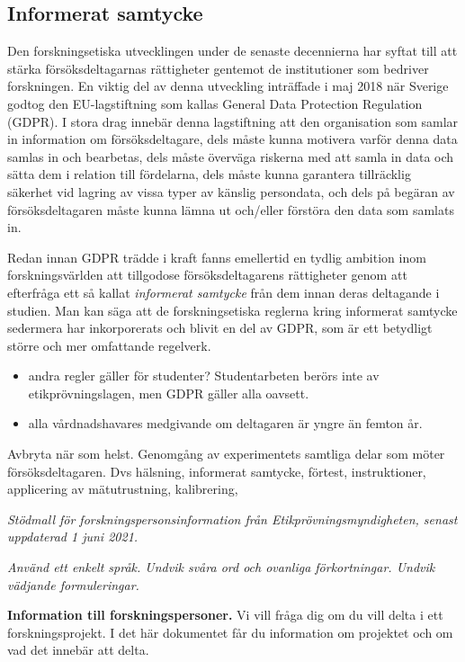 \documentclass[
]{book}
\begin{document}
\hypertarget{sub07.6.2}{%
\subsection{Informerat samtycke}\label{sub07.6.2}}

Den forskningsetiska utvecklingen under de senaste decennierna har syftat till att stärka försöksdeltagarnas rättigheter gentemot de institutioner som bedriver forskningen. En viktig del av denna utveckling inträffade i maj 2018 när Sverige godtog den EU-lagstiftning som kallas General Data Protection Regulation (GDPR). I stora drag innebär denna lagstiftning att den organisation som samlar in information om försöksdeltagare, dels måste kunna motivera varför denna data samlas in och bearbetas, dels måste överväga riskerna med att samla in data och sätta dem i relation till fördelarna, dels måste kunna garantera tillräcklig säkerhet vid lagring av vissa typer av känslig persondata, och dels på begäran av försöksdeltagaren måste kunna lämna ut och/eller förstöra den data som samlats in.

Redan innan GDPR trädde i kraft fanns emellertid en tydlig ambition inom forskningsvärlden att tillgodose försöksdeltagarens rättigheter genom att efterfråga ett så kallat \emph{informerat samtycke} från dem innan deras deltagande i studien. Man kan säga att de forskningsetiska reglerna kring informerat samtycke sedermera har inkorporerats och blivit en del av GDPR, som är ett betydligt större och mer omfattande regelverk.

\begin{itemize}
\item
  andra regler gäller för studenter? Studentarbeten berörs inte av etikprövningslagen, men GDPR gäller alla oavsett.
\item
  alla vårdnadshavares medgivande om deltagaren är yngre än femton år.
\end{itemize}

Avbryta när som helst. Genomgång av experimentets samtliga delar som möter försöksdeltagaren. Dvs hälsning, informerat samtycke, förtest, instruktioner, applicering av mätutrustning, kalibrering,

\emph{Stödmall för forskningspersonsinformation från Etikprövningsmyndigheten, senast uppdaterad 1 juni 2021.}

\emph{Använd ett enkelt språk. Undvik svåra ord och ovanliga förkortningar. Undvik vädjande formuleringar.}

\textbf{Information till forskningspersoner.} Vi vill fråga dig om du vill delta i ett forskningsprojekt. I det här dokumentet får du information om projektet och om vad det innebär att delta.
\end{document}
